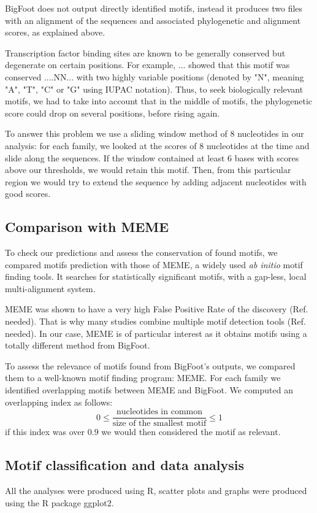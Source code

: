 BigFoot does not output directly identified motifs, instead it produces two files with an alignment of the sequences and associated phylogenetic and alignment scores, as explained above.

Transcription factor binding sites are known to be generally conserved but degenerate on certain positions. For example, ... showed that this motif was conserved ....NN... with two highly variable positions (denoted by "N", meaning "A", "T", "C" or "G" using IUPAC notation). Thus, to seek biologically relevant motifs, we had to take into account that in the middle of motifs, the phylogenetic score could drop on several positions, before rising again.

To answer this problem we use a sliding window method of 8 nucleotides in our analysis: for each family, we looked at the scores of 8 nucleotides at the time and slide along the sequences. If the window contained at least 6 bases with scores above our thresholds, we would retain this motif. Then, from this particular region we would try to extend the sequence by adding adjacent nucleotides with good scores.

\subsection*{Comparison with MEME}

To check our predictions and assess the conservation of found motifs, we compared motifs prediction with those of MEME, a widely used \textit{ab initio} motif finding tools. It searches for statistically significant motifs, with a gap-less, local multi-alignment system.

MEME was shown to have a very high False Positive Rate of the discovery (Ref. needed). That is why many studies combine multiple motif detection tools (Ref. needed). In our case, MEME is of particular interest as it obtains motifs using a totally different method from BigFoot.

To assess the relevance of motifs found from BigFoot's outputs, we compared them to a well-known motif finding program: MEME. For each family we identified overlapping motifs between MEME and BigFoot. We computed an overlapping index as follows: 
\begin{equation}
0 \leq \frac{\text{nucleotides in common}}{\text{size of the smallest motif}} \leq 1
\end{equation}
if this index was over $0.9$ we would then considered the motif as relevant.

\subsection*{Motif classification and data analysis}

All the analyses were produced using R, scatter plots and graphs were produced using the R package ggplot2.

